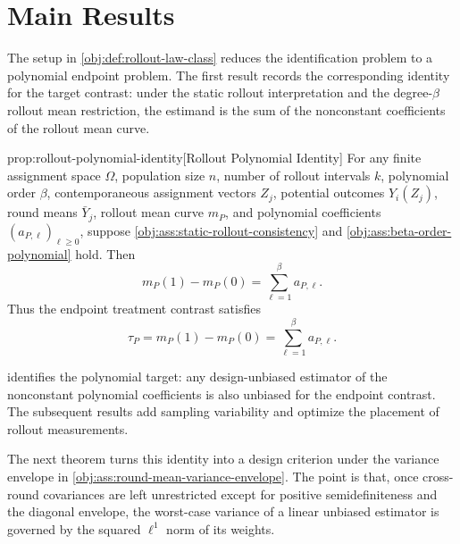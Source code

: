 \section{Main Results}

The setup in \cref{obj:def:rollout-law-class} reduces the identification problem to a polynomial endpoint problem. The first result records the corresponding identity for the target contrast: under the static rollout interpretation and the degree-\(\beta\) rollout mean restriction, the estimand is the sum of the nonconstant coefficients of the rollout mean curve.

\begin{lemmav}{prop:rollout-polynomial-identity}[Rollout Polynomial Identity]
For any finite assignment space $\Omega$, population size $n$, number of rollout intervals $k$, polynomial order $\beta$, contemporaneous assignment vectors $Z_j$, potential outcomes $Y_i(Z_j)$, round means $\bar Y_j$, rollout mean curve $m_P$, and polynomial coefficients $(a_{P,\ell})_{\ell\ge 0}$, suppose \cref{obj:ass:static-rollout-consistency} and \cref{obj:ass:beta-order-polynomial} hold. Then
\[
m_P(1)-m_P(0)=\sum_{\ell=1}^{\beta} a_{P,\ell}.
\]
Thus the endpoint treatment contrast satisfies
\[
\tau_P=m_P(1)-m_P(0)=\sum_{\ell=1}^{\beta} a_{P,\ell}.
\]
\end{lemmav}

 identifies the polynomial target: any design-unbiased estimator of the nonconstant polynomial coefficients is also unbiased for the endpoint contrast. The subsequent results add sampling variability and optimize the placement of rollout measurements.

The next theorem turns this identity into a design criterion under the variance envelope in \cref{obj:ass:round-mean-variance-envelope}. The point is that, once cross-round covariances are left unrestricted except for positive semidefiniteness and the diagonal envelope, the worst-case variance of a linear unbiased estimator is governed by the squared \(\ell^1\) norm of its weights.

